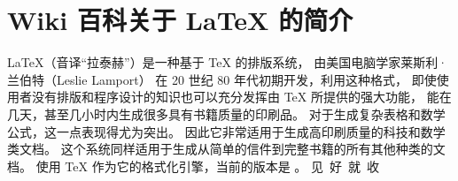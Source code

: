 \documentclass{ryslidepyramid}
\begin{document}
\newpage\section{Wiki 百科关于 \LaTeX{} 的简介}
\LaTeX{}（音译“拉泰赫”）是一种基于 \TeX{} 的排版系统，
由美国电脑学家莱斯利·兰伯特（Leslie Lamport）
在 20 世纪 80 年代初期开发，利用这种格式，
即使使用者没有排版和程序设计的知识也可以充分发挥由 \TeX{} 所提供的强大功能，
能在几天，甚至几小时内生成很多具有书籍质量的印刷品。
对于生成复杂表格和数学公式，这一点表现得尤为突出。
因此它非常适用于生成高印刷质量的科技和数学类文档。
这个系统同样适用于生成从简单的信件到完整书籍的所有其他种类的文档。
使用 \TeX{} 作为它的格式化引擎，当前的版本是 \LaTeXe{}。
\newpage
\vspace*{\fill}
{\centering\kaishu\color{white} 见\,\,\,好\,\,\,就\,\,\,收\\}
\vspace*{\fill}
\end{document}
